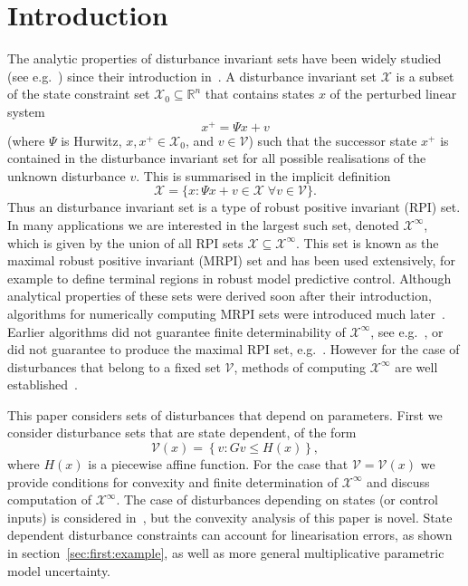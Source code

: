 \documentclass[letterpaper, 10pt, conference]{ieeeconf} %
\begin{document}
\section{Introduction}
The analytic properties of disturbance invariant sets have been widely studied (see e.g.~\cite{blanchini:2007}) 
since their introduction in~\cite{Glover:1971}. A disturbance invariant set $\mathscr X$ is a subset of the 
state constraint set $\mathcal X_0\subseteq\mathbb R^n$ that contains states $x$ of the perturbed linear system
\begin{equation}\label{eq:system:equation}
	x^+ = \Psi x + v
\end{equation}
(where $\Psi$ is Hurwitz, $x,x^+\in\mathcal X_0$, and 
$v\in\mathscr V$) such that the successor state $x^+$ is contained in the 
disturbance invariant set for all possible realisations of the 
unknown disturbance $v$. This is summarised in the implicit definition
\begin{equation}\label{eq:definition:MRPI:set:state:dependent}
	\mathscr X = \{x:\Psi x + v\in\mathscr X\; \forall v\in\mathscr V\}.
\end{equation}
Thus an disturbance invariant set is a type of robust positive invariant (RPI) set. 
In many applications we are interested in the largest such set, denoted $\mathcal X^\infty$, which is given 
by the union of all RPI sets $\mathscr X\subseteq\mathcal X^\infty$. This set is known as the maximal robust 
positive invariant (MRPI) set and has been used extensively, for example to define terminal regions in 
robust model predictive control. Although analytical properties
of these sets were derived soon after their introduction, algorithms for numerically computing MRPI sets 
were introduced much later~\cite{DeSantis:1994,Kolmanovsky:1995,Blanchini:1994}. 
Earlier algorithms did not guarantee finite determinability of $\mathcal X^\infty$, see e.g.~\cite{Blanchini:1990}, 
or did not guarantee to produce the maximal RPI set, e.g.~\cite{Blanchini:1991}. 
%
However for the case of disturbances that belong to a fixed set $\mathscr V$, methods of computing 
$\mathcal X^\infty$ are well established~\cite{blanchini:2007}.

This paper considers sets of disturbances that depend on parameters. First we consider disturbance 
sets that are state dependent, of the form
\begin{equation}\label{eq:PWA:distrubance:set}
	\mathcal V(x) = \left\{v: Gv\leq H(x)\right\},
\end{equation}
where $H(x)$ is a piecewise affine function. For the case that $\mathscr V=\mathcal V(x)$ we
provide conditions for convexity and finite determination of $\mathcal X^\infty$ and discuss 
computation of $\mathcal X^\infty$. The case of disturbances depending on states (or control inputs) 
is considered in~\cite{Kuntsevich:1995,rakovic06}, but the convexity analysis of this paper is novel. 
State dependent disturbance constraints can account for linearisation errors, as shown in section~\ref{sec:first:example}, 
as well as more general multiplicative parametric model uncertainty.
\end{document}
